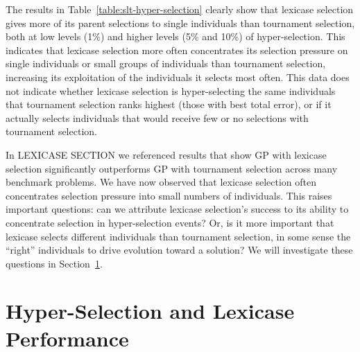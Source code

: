 \documentclass{sig-alternate}
\begin{document}

The results in Table~\ref{table:slt-hyper-selection} clearly show that lexicase selection gives more of its parent selections to single individuals than tournament selection, both at low levels (1\%) and higher levels (5\% and 10\%) of hyper-selection. This indicates that lexicase selection more often concentrates its selection pressure on single individuals or small groups of individuals than tournament selection, increasing its exploitation of the individuals it selects most often. This data does not indicate whether lexicase selection is hyper-selecting the same individuals that tournament selection ranks highest (those with best total error), or if it actually selects individuals that would receive few or no selections with tournament selection.

In LEXICASE SECTION we referenced results that show GP with lexicase selection significantly outperforms GP with tournament selection across many benchmark problems. We have now observed that lexicase selection often concentrates selection pressure into small numbers of individuals. This raises important questions: can we attribute lexicase selection's success to its ability to concentrate selection in hyper-selection events? Or, is it more important that lexicase selects different individuals than tournament selection, in some sense the ``right'' individuals to drive evolution toward a solution? We will investigate these questions in Section~\ref{section:HyperSelectionandLexicasePerformance}.

\section{Hyper-Selection and Lexicase Performance}
\label{section:HyperSelectionandLexicasePerformance}
\end{document}
